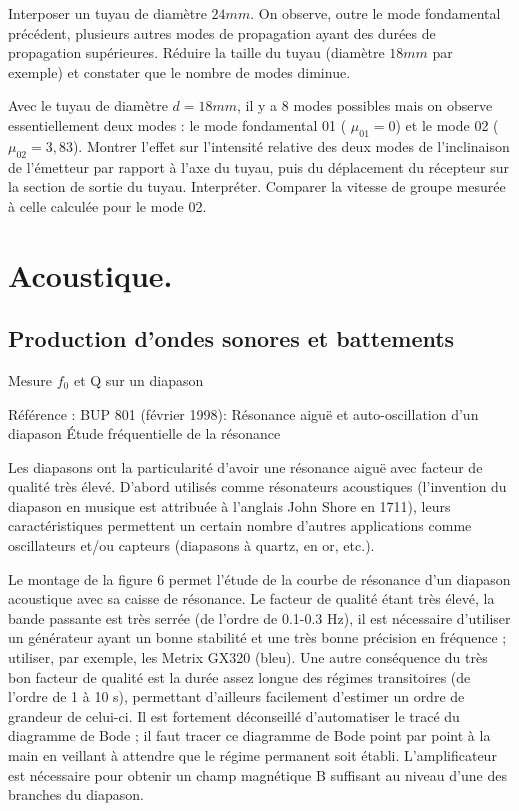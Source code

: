 \documentclass{article}%
\begin{document}
Interposer un tuyau de diamètre $24 mm$. On observe, outre le mode fondamental précédent, plusieurs autres modes de propagation ayant des durées de propagation supérieures. Réduire la taille du tuyau (diamètre $18 mm$ par exemple) et constater que le nombre de modes diminue.

Avec le tuyau de diamètre $d = 18 mm$, il y a 8 modes possibles mais on observe essentiellement deux modes : le mode fondamental 01 ( $\mu _{01} =0$) et le mode 02 ( $\mu _{02} = 3,83$). Montrer l'effet sur l'intensité relative des deux modes de l'inclinaison de l'émetteur par rapport à l'axe du tuyau, puis du déplacement du récepteur sur la section de sortie du tuyau. Interpréter. Comparer la vitesse de groupe mesurée à celle calculée pour le mode 02. 

\section{Acoustique.}
\subsection{Production d'ondes sonores et battements}
Mesure $f_0$ et Q sur un diapason

Référence : BUP 801 (février 1998): Résonance aiguë et auto-oscillation d'un diapason
Étude fréquentielle de la résonance

Les diapasons ont la particularité d'avoir une résonance aiguë avec facteur de qualité très élevé. D'abord utilisés comme résonateurs acoustiques (l'invention du diapason en musique est attribuée à l'anglais John Shore en 1711), leurs caractéristiques permettent un certain nombre d'autres applications comme oscillateurs et/ou capteurs (diapasons à quartz, en or, etc.).

Le montage de la figure 6 permet l'étude de la courbe de résonance d'un diapason acoustique avec sa caisse de résonance. Le facteur de qualité étant très élevé, la bande passante est très serrée (de l'ordre de 0.1-0.3 Hz), il est nécessaire d'utiliser un générateur ayant un bonne stabilité et une très bonne précision en fréquence ; utiliser, par exemple, les Metrix GX320 (bleu). Une autre conséquence du très bon facteur de qualité est la durée assez longue des régimes transitoires (de l'ordre de 1 à 10 s), permettant d'ailleurs facilement d'estimer un ordre de grandeur de celui-ci. Il est fortement déconseillé d'automatiser le tracé du diagramme de Bode ; il faut tracer ce diagramme de Bode point par point à la main en veillant à attendre que le régime permanent soit établi. L'amplificateur est nécessaire pour obtenir un champ magnétique B suffisant au niveau d'une des branches du diapason.
\end{document}
